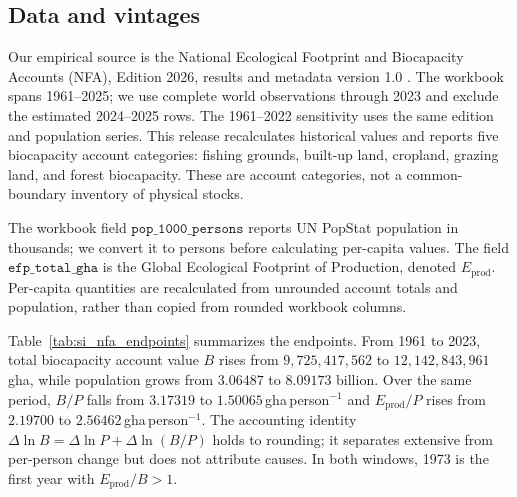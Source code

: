 \documentclass[11pt,a4paper]{article}
\begin{document}
\subsection{Data and vintages}\label{si:vintages}

Our empirical source is the National Ecological Footprint and Biocapacity Accounts (NFA), Edition 2026, results and metadata version 1.0 \citep{Lo2026NFA}. The workbook spans 1961--2025; we use complete world observations through 2023 and exclude the estimated 2024--2025 rows. The 1961--2022 sensitivity uses the same edition and population series. This release recalculates historical values and reports five biocapacity account categories: fishing grounds, built-up land, cropland, grazing land, and forest biocapacity. These are account categories, not a common-boundary inventory of physical stocks.

The workbook field $\texttt{pop\_1000\_persons}$ reports UN PopStat population in thousands; we convert it to persons before calculating per-capita values. The field $\texttt{efp\_total\_gha}$ is the Global Ecological Footprint of Production, denoted $E_{\mathrm{prod}}$. Per-capita quantities are recalculated from unrounded account totals and population, rather than copied from rounded workbook columns.

Table~\ref{tab:si_nfa_endpoints} summarizes the endpoints. From 1961 to 2023, total biocapacity account value $B$ rises from $9{,}725{,}417{,}562$ to $12{,}142{,}843{,}961$\,gha, while population grows from $3.06487$ to $8.09173$ billion. Over the same period, $B/P$ falls from $3.17319$ to $1.50065$\,gha\,person$^{-1}$ and $E_{\mathrm{prod}}/P$ rises from $2.19700$ to $2.56462$\,gha\,person$^{-1}$. The accounting identity $\Delta\ln B=\Delta\ln P+\Delta\ln(B/P)$ holds to rounding; it separates extensive from per-person change but does not attribute causes. In both windows, 1973 is the first year with $E_{\mathrm{prod}}/B>1$.
\end{document}
